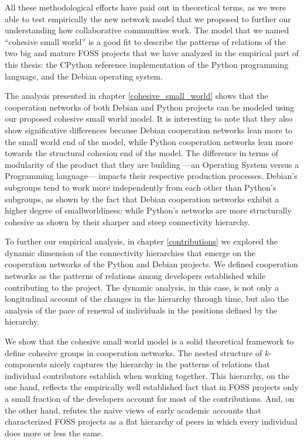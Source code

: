 All these methodological efforts have paid out in theoretical terms, as we were able to test empirically the new network model that we proposed to further our understanding how collaborative communities work. The model that we named ``cohesive small world'' is a good fit to describe the patterns of relations of the two big and mature FOSS projects that we have analyzed in the empirical part of this thesis: the CPython reference implementation of the Python programming language, and the Debian operating system.

The analysis presented in chapter \ref{cohesive_small_world} shows that the cooperation networks of both Debian and Python projects can be modeled using our proposed cohesive small world model. It is interesting to note that they also show significative differences because Debian cooperation networks lean more to the small world end of the model, while Python cooperation networks lean more towards the structural cohesion end of the model. The difference in terms of modularity of the product that they are building ---an Operating System versus a Programming language--- impacts their respective production processes. Debian's subgroups tend to work more independently from each other than Python's subgroups, as shown by the fact that Debian cooperation networks exhibit a higher degree of smallworldiness; while Python's networks are more structurally cohesive as shown by their sharper and steep connectivity hierarchy.

To further our empirical analysis, in chapter \ref{contributions} we explored the dynamic dimension of the connectivity hierarchies that emerge on the cooperation networks of the Python and Debian projects. We defined cooperation networks as the patterns of relations among developers established while contributing to the project. The dynamic analysis, in this case, is not only a longitudinal account of the changes in the hierarchy through time, but also the analysis of the pace of renewal of individuals in the positions defined by the hierarchy.

We show that the cohesive small world model is a solid theoretical framework to define cohesive groups in cooperation networks. The nested structure of $k$-components nicely captures the hierarchy in the patterns of relations that individual contributors establish when working together. This hierarchy, on the one hand, reflects the empirically well established fact that in FOSS projects only a small fraction of the developers account for most of the contributions. And, on the other hand, refutes the naive views of early academic accounts that characterized FOSS projects as a flat hierarchy of peers in which every individual does more or less the same. 

